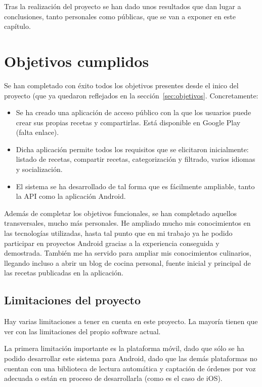 Tras la realización del proyecto se han dado unos resultados que dan lugar a
conclusiones, tanto personales como públicas, que se van a exponer en este
capítulo.

\section{Objetivos cumplidos}

Se han completado con éxito todos los objetivos presentes desde el inico del
proyecto (que ya quedaron reflejados en la sección~\ref{sec:objetivos}.
Concretamente:

\begin{itemize}
\item Se ha creado una aplicación de acceso público con la que los usuarios
  puede crear sus propias recetas y compartirlas. Está disponible en Google
  Play (falta enlace).
\item Dicha aplicación permite todos los requisitos que se elicitaron
  inicialmente: listado de recetas, compartir recetas, categorización y filtrado,
  varios idiomas y socialización.
\item El sistema se ha desarrollado de tal forma que es fácilmente ampliable,
  tanto la API como la aplicación Android.
\end{itemize}

Además de completar los objetivos funcionales, se han completado aquellos
transversales, mucho más personales. He ampliado mucho mis conocimientos en las
tecnologías utilizadas, hasta tal punto que en mi trabajo ya he podido
participar en proyectos Android gracias a la experiencia conseguida y
demostrada. También me ha servido para ampliar mis conocimientos culinarios,
llegando incluso a abrir un blog de cocina personal,\cite{noeliarcado} fuente
inicial y principal de las recetas publicadas en la aplicación.


\subsection{Limitaciones del proyecto}

Hay varias limitaciones a tener en cuenta en este proyecto. La mayoría tienen
que ver con las limitaciones del propio software actual.

La primera limitación importante es la plataforma móvil, dado que sólo se ha
podido desarrollar este sistema para Android, dado que las demás plataformas no
cuentan con una biblioteca de lectura automática y captación de órdenes por
voz adecuada o están en proceso de desarrollarla (como es el caso de iOS).

